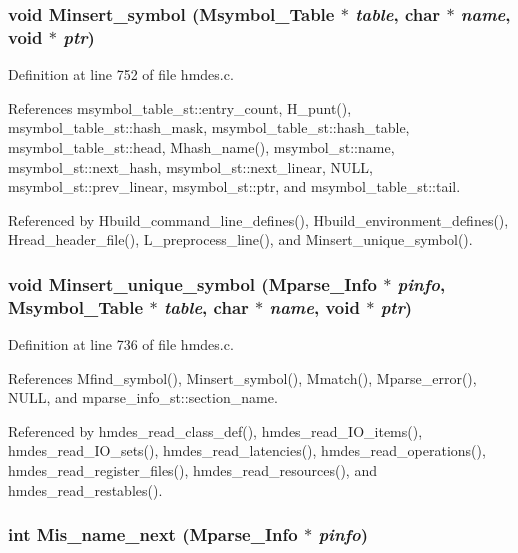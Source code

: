 \subsubsection{\setlength{\rightskip}{0pt plus 5cm}void Minsert\_\-symbol (\bf{Msymbol\_\-Table} $\ast$ {\em table}, char $\ast$ {\em name}, void $\ast$ {\em ptr})}\label{hmdes_8h_74d2d13e74689801a91905ef832e65af}




Definition at line 752 of file hmdes.c.

References msymbol\_\-table\_\-st::entry\_\-count, H\_\-punt(), msymbol\_\-table\_\-st::hash\_\-mask, msymbol\_\-table\_\-st::hash\_\-table, msymbol\_\-table\_\-st::head, Mhash\_\-name(), msymbol\_\-st::name, msymbol\_\-st::next\_\-hash, msymbol\_\-st::next\_\-linear, NULL, msymbol\_\-st::prev\_\-linear, msymbol\_\-st::ptr, and msymbol\_\-table\_\-st::tail.

Referenced by Hbuild\_\-command\_\-line\_\-defines(), Hbuild\_\-environment\_\-defines(), Hread\_\-header\_\-file(), L\_\-preprocess\_\-line(), and Minsert\_\-unique\_\-symbol().
\subsubsection{\setlength{\rightskip}{0pt plus 5cm}void Minsert\_\-unique\_\-symbol (\bf{Mparse\_\-Info} $\ast$ {\em pinfo}, \bf{Msymbol\_\-Table} $\ast$ {\em table}, char $\ast$ {\em name}, void $\ast$ {\em ptr})}\label{hmdes_8h_5ac6a523a50fd5a52219a1820c8ea6ad}




Definition at line 736 of file hmdes.c.

References Mfind\_\-symbol(), Minsert\_\-symbol(), Mmatch(), Mparse\_\-error(), NULL, and mparse\_\-info\_\-st::section\_\-name.

Referenced by hmdes\_\-read\_\-class\_\-def(), hmdes\_\-read\_\-IO\_\-items(), hmdes\_\-read\_\-IO\_\-sets(), hmdes\_\-read\_\-latencies(), hmdes\_\-read\_\-operations(), hmdes\_\-read\_\-register\_\-files(), hmdes\_\-read\_\-resources(), and hmdes\_\-read\_\-restables().
\subsubsection{\setlength{\rightskip}{0pt plus 5cm}int Mis\_\-name\_\-next (\bf{Mparse\_\-Info} $\ast$ {\em pinfo})}\label{hmdes_8h_7040d7057210a1a7921077362a420f82}




